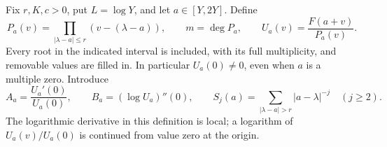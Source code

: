 Fix $r,K,c>0$, put $L=\log Y$, and let $a\in[Y,2Y]$. Define
\begin{equation}
 P_a(v)=\prod_{|\lambda-a|\le r}(v-(\lambda-a)),\qquad
 m=\deg P_a,\qquad U_a(v)=\frac{F(a+v)}{P_a(v)}.
 \label{na-cluster-definition}
\end{equation}
Every root in the indicated interval is included, with its full
multiplicity, and removable values are filled in. In particular
$U_a(0)\ne0$, even when $a$ is a multiple zero. Introduce
\begin{equation}
 A_a=\frac{U_a'(0)}{U_a(0)},\qquad
 B_a=(\log U_a)''(0),\qquad
 S_j(a)=\sum_{|\lambda-a|>r}|a-\lambda|^{-j}\quad(j\ge2).
 \label{na-exterior-data}
\end{equation}
The logarithmic derivative in this definition is local; a logarithm
of $U_a(v)/U_a(0)$ is continued from value zero at the origin.

